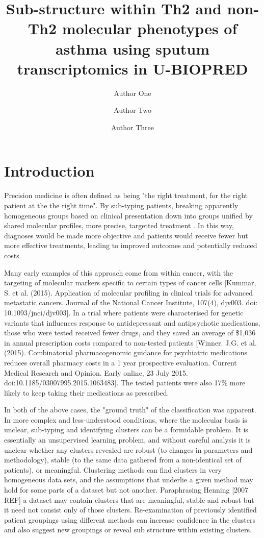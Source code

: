 \documentclass[9pt,twocolumn,twoside]{pnas-new}
\title{Sub-structure within Th2 and non-Th2 molecular phenotypes of asthma using sputum transcriptomics in U-BIOPRED }
\author[a,c,1]{Author One}
\author[b,1,2]{Author Two}
\author[a]{Author Three}
\affil[a]{Affiliation One}
\affil[b]{Affiliation Two}
\affil[c]{Affiliation Three}
\begin{document}
\maketitle

\section*{Introduction}

Precision medicine is often defined as being "the right treatment, for the right patient at the the right time". By sub-typing patients, breaking apparently homogeneous groups based on clinical presentation down into groups unified by shared molecular profiles, more precise, targetted treatment . In this way, diagnoses would be made more objective and patients would receive fewer but more effective treatments, leading to improved outcomes and potentially reduced costs. 

Many early examples of this approach come from within cancer, with the targeting of molecular markers specific to certain types of cancer cells [Kummar, S. et al. (2015). Application of molecular profiling in clinical trials for advanced metastatic cancers. Journal of the National Cancer Institute, 107(4), djv003. doi: 10.1093/jnci/djv003]. In a trial where patients were characterised for genetic variants that  influences response to antidepressant and antipsychotic medications, those who were tested received fewer drugs, and they saved an average of \$1,036 in annual prescription costs compared to non-tested patients [Winner. J.G. et al. (2015). Combinatorial pharmacogenomic guidance for psychiatric medications reduces overall pharmacy costs in a 1 year prospective evaluation. Current Medical Research and Opinion. Early online, 23 July 2015. doi:10.1185/03007995.2015.1063483]. The tested patients were also 17\% more likely to keep taking their medications as prescribed.

In both of the above cases, the "ground truth" of the classification was apparent. In more complex and less-understood conditions, where the molecular basis is unclear, sub-typing and identifying clusters can be a formidable problem. It is essentially an unsupervised learning problem, and without careful analysis it is unclear whether any clusters revealed are robust (to changes in parameters and methodology), stable (to the same data gathered from a non-identical set of patients), or meaningful.  Clustering methods can find clusters in very homogeneous data sets, and the assumptions that underlie a given method may hold for some parts of a dataset but not another. Paraphrasing Henning [2007 REF] a dataset may contain clusters that are meaningful, stable and robust but it need not consist only of those clusters. Re-examination of previously identified patient groupings using different methods can increase confidence in the clusters and also suggest new groupings or reveal sub structure within existing clusters. 
\end{document}
